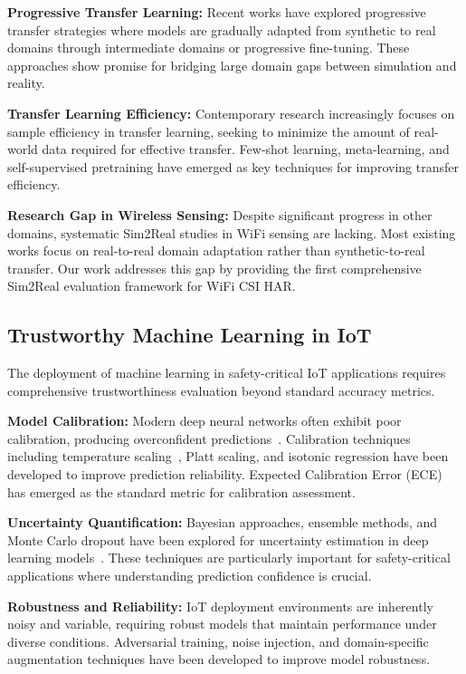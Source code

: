 \textbf{Progressive Transfer Learning:} Recent works have explored progressive transfer strategies where models are gradually adapted from synthetic to real domains through intermediate domains or progressive fine-tuning. These approaches show promise for bridging large domain gaps between simulation and reality.

\textbf{Transfer Learning Efficiency:} Contemporary research increasingly focuses on sample efficiency in transfer learning, seeking to minimize the amount of real-world data required for effective transfer. Few-shot learning, meta-learning, and self-supervised pretraining have emerged as key techniques for improving transfer efficiency.

\textbf{Research Gap in Wireless Sensing:} Despite significant progress in other domains, systematic Sim2Real studies in WiFi sensing are lacking. Most existing works focus on real-to-real domain adaptation rather than synthetic-to-real transfer. Our work addresses this gap by providing the first comprehensive Sim2Real evaluation framework for WiFi CSI HAR.

\subsection{Trustworthy Machine Learning in IoT}

The deployment of machine learning in safety-critical IoT applications requires comprehensive trustworthiness evaluation beyond standard accuracy metrics.

\textbf{Model Calibration:} Modern deep neural networks often exhibit poor calibration, producing overconfident predictions~\cite{calibration_guo2017}. Calibration techniques including temperature scaling~\cite{temperature_scaling2017}, Platt scaling, and isotonic regression have been developed to improve prediction reliability. Expected Calibration Error (ECE) has emerged as the standard metric for calibration assessment.

\textbf{Uncertainty Quantification:} Bayesian approaches, ensemble methods, and Monte Carlo dropout have been explored for uncertainty estimation in deep learning models~\cite{reliability_assessment2019}. These techniques are particularly important for safety-critical applications where understanding prediction confidence is crucial.

\textbf{Robustness and Reliability:} IoT deployment environments are inherently noisy and variable, requiring robust models that maintain performance under diverse conditions. Adversarial training, noise injection, and domain-specific augmentation techniques have been developed to improve model robustness.

